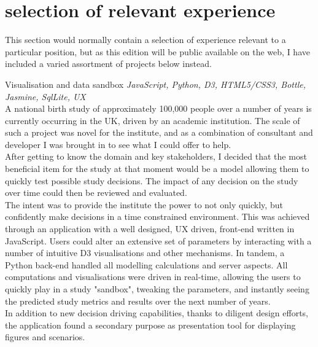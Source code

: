 \documentclass[]{friggeri-cv} %
\begin{document}

\newpage
\section{selection of relevant experience}
This section would normally contain a selection of experience relevant to a particular position, but as this edition will be public available on the web, I have included a varied assortment of projects below instead. 

\begin{projectentrylist}
\projectentry
{Visualisation and data sandbox}
{\emph{JavaScript, Python, D3, HTML5/CSS3, Bottle, Jasmine, SqlLite, UX} \\
A national birth study of approximately 100,000 people over a number of years is currently occurring in the UK, driven by an academic institution. The scale of such a project was novel for the institute, and as a combination of consultant and developer I was brought in to see what I could offer to help.\\
After getting to know the domain and key stakeholders, I decided that the most beneficial item for the study at that moment would be a model allowing them to quickly test possible study decisions. The impact of any decision on the study over time could then be reviewed and evaluated.  \\
The intent was to provide the institute the power to not only quickly, but confidently make decisions in a time constrained environment. This was achieved through an application with a well designed, UX driven, front-end written in JavaScript. Users could  alter an extensive set of parameters by interacting with a number of intuitive D3 visualisations and other mechanisms. In tandem, a Python back-end handled all modelling calculations and server aspects. All computations and visualisations were driven in real-time, allowing the users to quickly play in a study "sandbox", tweaking the parameters, and instantly seeing the predicted study metrics and results over the next number of years. \\
In addition to new decision driving capabilities,  thanks to diligent design efforts, the application found a secondary purpose as presentation tool for displaying figures and scenarios.}


\end{projectentrylist}
\end{document}
